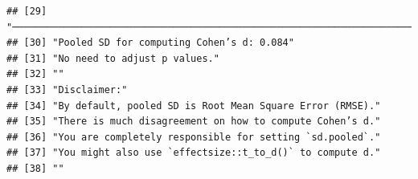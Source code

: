 \documentclass[
  man]{apa6}
\begin{document}
\begin{verbatim}
## [29] "────────────────────────────────────────────────────────────────────────────────"  
## [30] "Pooled SD for computing Cohen’s d: 0.084"                                          
## [31] "No need to adjust p values."                                                       
## [32] ""                                                                                  
## [33] "Disclaimer:"                                                                       
## [34] "By default, pooled SD is Root Mean Square Error (RMSE)."                           
## [35] "There is much disagreement on how to compute Cohen’s d."                           
## [36] "You are completely responsible for setting `sd.pooled`."                           
## [37] "You might also use `effectsize::t_to_d()` to compute d."                           
## [38] ""
\end{verbatim}
\end{document}
